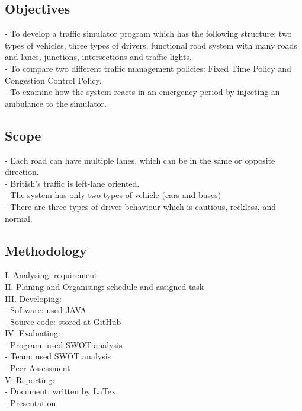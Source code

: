 \documentclass[11pt]{article}
\begin{document}
	\subsection{Objectives}
	\indent\indent- To develop a traffic simulator program which has the following structure: two types of vehicles, three types of drivers, functional road system with many roads and lanes, junctions, intersections and traffic lights. \\
	\indent - To compare two different traffic management policies: Fixed Time Policy and Congestion Control Policy. \\
	\indent - To examine how the system reacts in an emergency period  by injecting an ambulance to the simulator. 
	
	\subsection{Scope}	
	\indent\indent - Each road can have multiple lanes, which can be in the same or opposite direction. \\
	\indent - British’s traffic is left-lane oriented. \\
	\indent - The system has only two types of vehicle (cars and buses) \\
	\indent - There are three types of driver behaviour which is  cautious, reckless, and normal. 
	
	\subsection{Methodology} 
	\indent\indent I.	Analysing: requirement \\
	\indent II.	Planing and Organising: schedule and assigned task\\
	\indent III.	Developing: \\
			\indent\indent - Software: used JAVA\\
			\indent\indent - Source code: stored at GitHub\\
	\indent IV.	Evaluating:\\
			\indent\indent - Program: used SWOT analysis\\
			\indent\indent - Team: used SWOT analysis\\
			\indent\indent - Peer Assessment\\
	\indent V. 	Reporting:\\
			\indent\indent - Document: written by LaTex\\
			\indent\indent - Presentation
			
\end{document}
